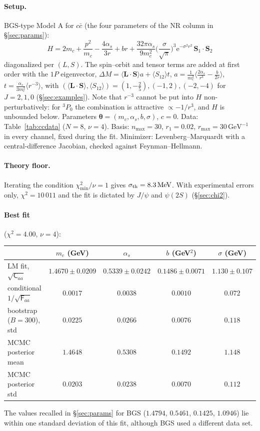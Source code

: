 \documentclass[11pt,a4paper]{article}
\numberwithin{equation}{section}
\theoremstyle{definition}
\theoremstyle{plain}
\theoremstyle{remark}
\numberwithin{algorithm}{section}
\newcommand{\vL}{\bm L}
\newcommand{\vS}{\bm S}
\newcommand{\as}{\alpha_s}
\newcommand{\ee}{\mathrm{e}}
\newcommand{\GeV}{\,\mathrm{GeV}}
\newcommand{\MeV}{\,\mathrm{MeV}}
\newcommand{\sF}{\mathsf F}
\newcommand{\sC}{\mathsf C}
\newcommand{\vth}{\bm\theta}
\begin{document}
\paragraph{Setup.} BGS-type Model A for $c\bar c$ (the four parameters of the NR column in \S\ref{sec:params}):
\[
H=2m_c+\frac{p^2}{m_c}-\frac{4\as}{3r}+br+\frac{32\pi\as}{9m_c^2}\Big(\frac{\sigma}{\sqrt\pi}\Big)^3\ee^{-\sigma^2r^2}\,\vS_1\!\cdot\!\vS_2
\]
diagonalized per $(L,S)$. The spin--orbit and tensor terms are added at first order with the $1P$ eigenvector, $\Delta M=\langle\vL\cdot\vS\rangle a+\langle S_{12}\rangle t$, $a=\frac{1}{m_c^2}\langle\frac{2\as}{r^3}-\frac{b}{2r}\rangle$, $t=\frac{\as}{3m_c^2}\langle r^{-3}\rangle$, with $(\langle\vL\cdot\vS\rangle,\langle S_{12}\rangle)=(1,-\frac25),(-1,2),(-2,-4)$ for $J=2,1,0$ (\S\ref{sec:examples}). Note that $r^{-3}$ cannot be put into $H$ non-perturbatively: for ${}^3P_0$ the combination is attractive $\propto-1/r^3$, and $H$ is unbounded below. Parameters $\vth=(m_c,\as,b,\sigma)$, $c=0$. Data: Table~\ref{tab:ccdata} ($N=8$, $\nu=4$). Basis: $n_{\max}=30$, $r_1=0.02$, $r_{\max}=30\GeV^{-1}$ in every channel, fixed during the fit. Minimizer: Levenberg--Marquardt with a central-difference Jacobian, checked against Feynman--Hellmann.

\paragraph{Theory floor.} Iterating the condition $\chi^2_{\min}/\nu=1$ gives $\sigma_{\rm th}=8.3\MeV$. With experimental errors only, $\chi^2=10\,011$ and the fit is dictated by $J/\psi$ and $\psi(2S)$ (\S\ref{sec:chi2}).

\paragraph{Best fit} ($\chi^2=4.00$, $\nu=4$):
\begin{center}\small
\begin{tabular}{@{}lcccc@{}}\toprule
 & $m_c$ (GeV) & $\as$ & $b$ (GeV$^2$) & $\sigma$ (GeV)\\\midrule
LM fit, $\sqrt{\sC_{aa}}$ & $1.4670\pm0.0209$ & $0.5339\pm0.0242$ & $0.1486\pm0.0071$ & $1.130\pm0.107$\\
conditional $1/\sqrt{\sF_{aa}}$ & $0.0017$ & $0.0038$ & $0.0010$ & $0.072$\\
bootstrap ($B=300$), std & $0.0225$ & $0.0266$ & $0.0076$ & $0.118$\\
MCMC posterior mean & $1.4648$ & $0.5308$ & $0.1492$ & $1.148$\\
MCMC posterior std & $0.0203$ & $0.0238$ & $0.0070$ & $0.112$\\\bottomrule
\end{tabular}
\end{center}
The values recalled in \S\ref{sec:params} for BGS ($1.4794$, $0.5461$, $0.1425$, $1.0946$) lie within one standard deviation of this fit, although BGS used a different data set.
\end{document}
